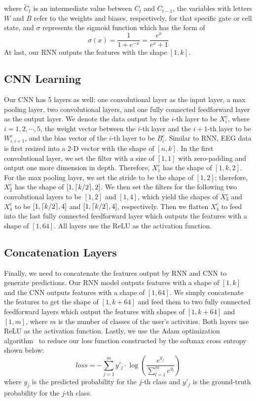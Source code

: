 where $\widetilde{C}_{t}$ is an intermediate value between $C_{t}$ and $C_{t-1}$, the variables with letters $W$ and $B$ refer to the weights and biases, respectively, for that specific gate or cell state, and $\sigma$ represents the sigmoid function which has the form of
\begin{equation}
\sigma(x) = \frac{1}{1+e^{-x}} = \frac{e^{x}}{e^{x} + 1}
\end{equation}
At last, our RNN outputs the features with the shape $[1, k]$. 

\subsection{CNN Learning}
Our CNN has 5 layers as well: one convolutional layer as the input layer, a max pooling layer, two convolutional layers, and one fully connected feedforward layer as the output layer. We denote the data output by the $i$-th layer to be $X_i^{c}$, where $i=1,2,\cdots,5$, the weight vector between the $i$-th layer and the $i+1$-th layer to be $W_{i,i+1}^{c}$, and the bias vector of the $i$-th layer to be $B_{i}^{c}$. Similar to RNN, EEG data is first resized into a 2-D vector with the shape of $[n,k]$. In the first convolutional layer, we set the filter with a size of $[1, 1]$ with zero-padding and output one more dimension in depth. Therefore, $X_1^{c}$ has the shape of $[1, k, 2]$. For the max pooling layer, we set the stride to be the shape of $[1, 2]$; therefore, $X_{2}^{c}$ has the shape of $[1, \lceil k/2\rceil, 2]$. We then set the filters for the following two convolutional layers to be $[1, 2]$ and $[1, 4]$, which yield the shapes of $X_3^{c}$ and $X_4^{c}$ to be $[1, \lceil k/2\rceil, 4]$ and $[1, \lceil k/2\rceil, 4]$, respectively. Then we flatten $X_4^{c}$ to feed into the last fully connected feedforward layer which outputs the features with a shape of $[1, 64]$. All layers use the ReLU as the activation function.

\subsection{Concatenation Layers}
Finally, we need to concatenate the features output by RNN and CNN to generate predictions. Our RNN model outputs features with a shape of $[1, k]$ and the CNN outputs features with a shape of $[1, 64]$. We simply concatenate the features to get the shape of $[1, k + 64]$ and feed them to two fully connected feedforward layers which output the features with shapes of $[1, k+64]$ and $[1, m]$, where $m$ is the number of classes of the user's activities. Both layers use ReLU as the activation function. Lastly, we use the Adam optimization algorithm~\cite{kingma2014adam} to reduce our loss function constructed by the softmax cross entropy shown below:
\begin{equation}
loss = - \sum_{j=1}^{m} y'_j \cdot \log(\frac{e^{y_j}}{\sum_{l=1}^m e^{y_l}})
\end{equation}
where $y_j$ is the predicted probability for the $j$-th class and $y'_j$ is the ground-truth probability for the $j$-th class.



